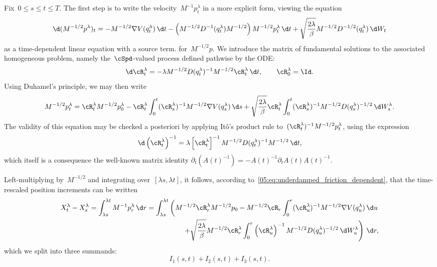 Fix~$0\leq s\leq t \leq T$. The first step is to write the velocity~$M^{-1}p_t^\lambda$ in a more explicit form, viewing the equation
\begin{equation}
    \d(M^{-1/2}p^\lambda)_t = -M^{-1/2}\nabla V(q_t^\lambda)\,\d t - \left(M^{-1/2}D^{-1}(q_t^\lambda)M^{-1/2}\right)M^{-1/2}p_t^\lambda\,\d t + \sqrt{\frac{2\lambda}{\beta}}M^{-1/2}D^{-1/2}(q_t^\lambda)\,\d W_t 
\end{equation}
as a time-dependent linear equation with a source term. for~$M^{-1/2}p$.
We introduce the matrix of fundamental solutions to the associated homogeneous problem, namely the~$\cSpd$-valued process defined pathwise by the ODE:
\begin{equation}
    \label{05:eq:fundamental_matrix_ode}
    \d\cR^\lambda_t = -\lambda M^{-1/2} D(q_t^\lambda)^{-1}M^{-1/2}\cR^\lambda_t\,\d t,\qquad \cR^\lambda_0 = \Id.
\end{equation}
Using Duhamel's principle, we may then write
\begin{equation}
    M^{-1/2}p^\lambda_t = \cR_{t}^\lambda M^{-1/2}p_0^\lambda - \cR_t^\lambda\int_0^t (\cR_{s}^\lambda)^{-1}M^{-1/2}\nabla V(q_s^\lambda)\,\d s+\sqrt{\frac{2\lambda}{\beta}}\cR_t^\lambda\int_0^t (\cR_{s}^\lambda)^{-1} M^{-1/2}D(q_s^\lambda)^{-1/2}\,\d W^\lambda_s.
\end{equation}
The validity of this equation may be checked a posteriori by applying Itô's product rule to~$(\cR_t^\lambda)^{-1}M^{-1/2}p_t^\lambda$, using the expression
\begin{equation}
    \label{05:eq:matrix_diff_expr}
    \d\left(\cR_t^\lambda\right)^{-1} = \lambda \left[\cR_t^\lambda\right]^{-1}M^{-1/2}D(q_t^\lambda)^{-1}M^{-1/2}\,\d t,
\end{equation}
which itself is a consequence the well-known matrix identity $\partial_t (A(t)^{-1}) = - A(t)^{-1}\partial_t A(t) A(t)^{-1}$.

Left-multiplying by~$M^{-1/2}$ and integrating over~$[\lambda s,\lambda t]$, it follows, according to~\eqref{05:eq:underdamped_friction_dependent}, that the time-rescaled position increments can be written
    \begin{equation}
        \begin{aligned}
        X_t^\lambda - X_s^\lambda = \int_{\lambda s}^{\lambda t}M^{-1}p_r^\lambda\,\d r = \int_{\lambda s}^{\lambda t}\left(M^{-1/2}\cR_{r}^\lambda M^{-1/2}p_0- M^{-1/2}\cR_r\int_0^r (\cR_{u}^\lambda)^{-1}M^{-1/2}\nabla V(q_u^\lambda)\,\d u\right.\\\left.+\sqrt{\frac{2\lambda}{\beta}}M^{-1/2}\cR^\lambda_r\int_0^r \left(\cR_{u}^{\lambda}\right)^{-1}M^{-1/2} D(q_u^\lambda)^{-1/2}\,\d W^\lambda_u\right)\,\d r,
    \end{aligned}
\end{equation}
which we split into three summands:
\begin{equation}
    I_1(s,t)+I_2(s,t)+I_3(s,t).
\end{equation}

